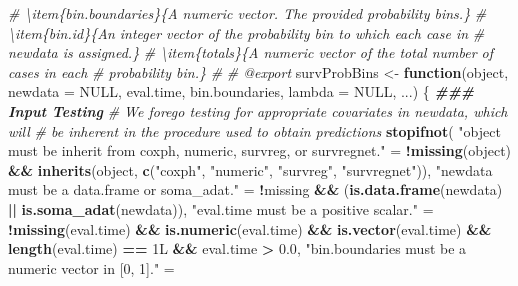 \documentclass[
]{book}
\newenvironment{Shaded}{\begin{snugshade}}{\end{snugshade}}
\newcommand{\AttributeTok}[1]{\textcolor[rgb]{0.13,0.29,0.53}{#1}}
\newcommand{\CommentTok}[1]{\textcolor[rgb]{0.56,0.35,0.01}{\textit{#1}}}
\newcommand{\ConstantTok}[1]{\textcolor[rgb]{0.56,0.35,0.01}{#1}}
\newcommand{\ControlFlowTok}[1]{\textcolor[rgb]{0.13,0.29,0.53}{\textbf{#1}}}
\newcommand{\DocumentationTok}[1]{\textcolor[rgb]{0.56,0.35,0.01}{\textbf{\textit{#1}}}}
\newcommand{\FloatTok}[1]{\textcolor[rgb]{0.00,0.00,0.81}{#1}}
\newcommand{\FunctionTok}[1]{\textcolor[rgb]{0.13,0.29,0.53}{\textbf{#1}}}
\newcommand{\NormalTok}[1]{#1}
\newcommand{\OtherTok}[1]{\textcolor[rgb]{0.56,0.35,0.01}{#1}}
\newcommand{\SpecialCharTok}[1]{\textcolor[rgb]{0.81,0.36,0.00}{\textbf{#1}}}
\newcommand{\StringTok}[1]{\textcolor[rgb]{0.31,0.60,0.02}{#1}}
\begin{document}
\begin{Shaded}
\begin{Highlighting}[]
\CommentTok{\#\textquotesingle{} \textbackslash{}item\{bin.boundaries\}\{A numeric vector. The provided probability bins.\}}
\CommentTok{\#\textquotesingle{} \textbackslash{}item\{bin.id\}\{An integer vector of the probability bin to which each case in }
\CommentTok{\#\textquotesingle{}   \textasciigrave{}newdata\textasciigrave{} is assigned.\}}
\CommentTok{\#\textquotesingle{} \textbackslash{}item\{totals\}\{A numeric vector of the total number of cases in each }
\CommentTok{\#\textquotesingle{}   probability bin.\}}
\CommentTok{\#\textquotesingle{} }
\CommentTok{\#\textquotesingle{} @export}
\NormalTok{survProbBins }\OtherTok{\textless{}{-}} \ControlFlowTok{function}\NormalTok{(object, }\AttributeTok{newdata =} \ConstantTok{NULL}\NormalTok{, eval.time, bin.boundaries, }
                         \AttributeTok{lambda =} \ConstantTok{NULL}\NormalTok{, ...) \{ }
  \DocumentationTok{\#\#\# Input Testing}
  \CommentTok{\# We forego testing for appropriate covariates in \textasciigrave{}newdata\textasciigrave{}, which will}
  \CommentTok{\#   be inherent in the procedure used to obtain predictions}
  \FunctionTok{stopifnot}\NormalTok{(}
    \StringTok{"\textasciigrave{}object\textasciigrave{} must be inherit from \textasciigrave{}coxph\textasciigrave{}, \textasciigrave{}numeric\textasciigrave{}, \textasciigrave{}survreg\textasciigrave{}, or \textasciigrave{}survregnet\textasciigrave{}."} \OtherTok{=}
      \SpecialCharTok{!}\FunctionTok{missing}\NormalTok{(object) }\SpecialCharTok{\&\&} \FunctionTok{inherits}\NormalTok{(object, }\FunctionTok{c}\NormalTok{(}\StringTok{"coxph"}\NormalTok{, }\StringTok{"numeric"}\NormalTok{, }\StringTok{"survreg"}\NormalTok{, }\StringTok{"survregnet"}\NormalTok{)),}
    \StringTok{"\textasciigrave{}newdata\textasciigrave{} must be a data.frame or soma\_adat."} \OtherTok{=} 
      \SpecialCharTok{!}\NormalTok{missing }\SpecialCharTok{\&\&}\NormalTok{ (}\FunctionTok{is.data.frame}\NormalTok{(newdata) }\SpecialCharTok{||} \FunctionTok{is.soma\_adat}\NormalTok{(newdata)),}
    \StringTok{"\textasciigrave{}eval.time\textasciigrave{} must be a positive scalar."} \OtherTok{=} 
      \SpecialCharTok{!}\FunctionTok{missing}\NormalTok{(eval.time) }\SpecialCharTok{\&\&} \FunctionTok{is.numeric}\NormalTok{(eval.time) }\SpecialCharTok{\&\&} 
        \FunctionTok{is.vector}\NormalTok{(eval.time) }\SpecialCharTok{\&\&} \FunctionTok{length}\NormalTok{(eval.time) }\SpecialCharTok{==}\NormalTok{ 1L }\SpecialCharTok{\&\&}\NormalTok{ eval.time }\SpecialCharTok{\textgreater{}} \FloatTok{0.0}\NormalTok{,}
    \StringTok{"\textasciigrave{}bin.boundaries\textasciigrave{} must be a numeric vector in [0, 1]."} \OtherTok{=} 

\end{Highlighting}
\end{Shaded}
\end{document}
